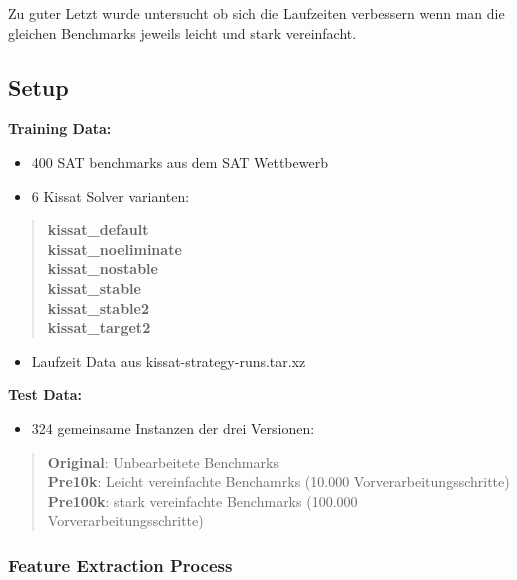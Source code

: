 Zu guter Letzt wurde untersucht ob sich die Laufzeiten verbessern wenn man die gleichen Benchmarks 
jeweils leicht und stark vereinfacht.

\newpage

\subsection{Setup}

\textbf{Training Data:}
\begin{itemize}
    \setlength{\itemsep}{0pt}
    \setlength{\parskip}{0pt}
    \setlength{\parsep}{0pt}
    \item 400 SAT benchmarks aus dem SAT Wettbewerb \cite{satcompetition2025}
    \item 6 Kissat Solver varianten: \cite{biere2020kissat}
\end{itemize}

\begin{quote}
    \textbf{kissat\_default} \\
    \textbf{kissat\_noeliminate} \\
    \textbf{kissat\_nostable} \\
    \textbf{kissat\_stable} \\
    \textbf{kissat\_stable2} \\
    \textbf{kissat\_target2} 
\end{quote}

\begin{itemize}
    \item Laufzeit Data aus kissat-strategy-runs.tar.xz \cite{runtimes2025}
\end{itemize}

\textbf{Test Data:}
\begin{itemize}
    \item 324 gemeinsame Instanzen der drei Versionen: \cite{runtimes2025}
\end{itemize}

\begin{quote}
    \textbf{Original}: Unbearbeitete Benchmarks \\
    \textbf{Pre10k}: Leicht vereinfachte Benchamrks (10.000 Vorverarbeitungsschritte) \\
    \textbf{Pre100k}: stark vereinfachte Benchmarks (100.000 Vorverarbeitungsschritte)
\end{quote}

\subsubsection{Feature Extraction Process}


